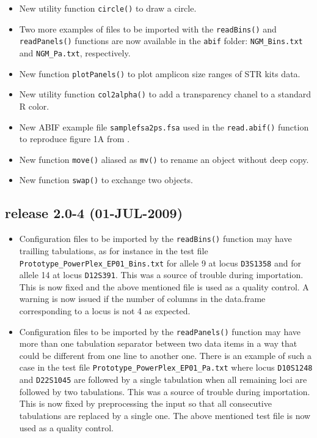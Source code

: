 \documentclass{article}
\begin{document}
\begin{itemize}

\item New utility function \texttt{circle()} to draw a circle.

\item Two more examples of files to be imported with the \texttt{readBins()}
and \texttt{readPanels()} functions are now available in the \texttt{abif}
folder: \texttt{NGM\_Bins.txt} and \texttt{NGM\_Pa.txt}, respectively.

\item New function \texttt{plotPanels()} to plot amplicon size ranges of STR kits data.

\item New utility function \texttt{col2alpha()} to add a transparency chanel to a standard R color.

\item New ABIF example file \texttt{samplefsa2ps.fsa} used in the
\texttt{read.abif()} function to reproduce figure 1A from \cite{Krawczyk2009}.

\item New function \texttt{move()} aliased as \texttt{mv()} to rename
an object without deep copy.

\item New function \texttt{swap()} to exchange two objects.

\end{itemize}

\subsection*{release 2.0-4 (01-JUL-2009)}

\begin{itemize}

\item Configuration files to be imported by the \texttt{readBins()}
function may have trailling tabulations, as for instance in the
test file \texttt{Prototype\_PowerPlex\_EP01\_Bins.txt} for allele
9 at locus \texttt{D3S1358} and for allele 14 at locus \texttt{D12S391}.
This was a source of trouble during importation. This is now fixed
and the above mentioned file is used as a quality control. A warning
is now issued if the number of columns in the data.frame corresponding
to a locus is not 4 as expected.

\item Configuration files to be imported by the \texttt{readPanels()}
function may have more than one tabulation separator between
two data items in a way that could be different from one
line to another one. There is an example of such a case in the
test file \texttt{Prototype\_PowerPlex\_EP01\_Pa.txt} where
locus \texttt{D10S1248} and \texttt{D22S1045} are followed by a
single tabulation when all remaining loci are followed by two
tabulations.
This was a source of trouble during importation.
This is now fixed by preprocessing the input so that
all consecutive tabulations are replaced by a single one.
The above mentioned test file is now used as a quality control.

\end{itemize}
\end{document}
